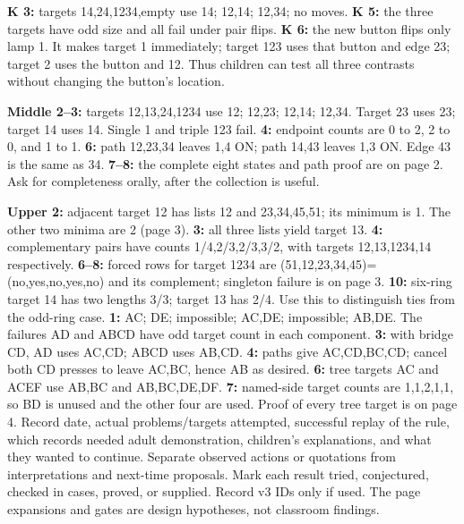 \documentclass[12pt]{extarticle}
\begin{document}
\newpage
{}
\textbf{K 3:} targets 14,24,1234,empty use 14; 12,14; 12,34; no moves. \textbf{K 5:} the three targets have odd size and all fail under pair flips. \textbf{K 6:} the new button flips only lamp 1. It makes target 1 immediately; target 123 uses that button and edge 23; target 2 uses the button and 12. Thus children can test all three contrasts without changing the button's location.\par
\textbf{Middle 2--3:} targets 12,13,24,1234 use 12; 12,23; 12,14; 12,34. Target 23 uses 23; target 14 uses 14. Single 1 and triple 123 fail. \textbf{4:} endpoint counts are 0 to 2, 2 to 0, and 1 to 1. \textbf{6:} path 12,23,34 leaves 1,4 ON; path 14,43 leaves 1,3 ON. Edge 43 is the same as 34. \textbf{7--8:} the complete eight states and path proof are on page 2. Ask for completeness orally, after the collection is useful.\par
\textbf{Upper 2:} adjacent target 12 has lists 12 and 23,34,45,51; its minimum is 1. The other two minima are 2 (page 3). \textbf{3:} all three lists yield target 13. \textbf{4:} complementary pairs have counts 1/4,2/3,2/3,3/2, with targets 12,13,1234,14 respectively. \textbf{6--8:} forced rows for target 1234 are (51,12,23,34,45)=(no,yes,no,yes,no) and its complement; singleton failure is on page 3. \textbf{10:} six-ring target 14 has two lengths 3/3; target 13 has 2/4. Use this to distinguish ties from the odd-ring case.
\textbf{1:} AC; DE; impossible; AC,DE; impossible; AB,DE. The failures AD and ABCD have odd target count in each component. \textbf{3:} with bridge CD, AD uses AC,CD; ABCD uses AB,CD. \textbf{4:} paths give AC,CD,BC,CD; cancel both CD presses to leave AC,BC, hence AB as desired. \textbf{6:} tree targets AC and ACEF use AB,BC and AB,BC,DE,DF. \textbf{7:} named-side target counts are 1,1,2,1,1, so BD is unused and the other four are used. Proof of every tree target is on page 4.
Record date, actual problems/targets attempted, successful replay of the rule, which records needed adult demonstration, children's explanations, and what they wanted to continue. Separate observed actions or quotations from interpretations and next-time proposals. Mark each result tried, conjectured, checked in cases, proved, or supplied. Record v3 IDs only if used. The page expansions and gates are design hypotheses, not classroom findings.
\end{document}
